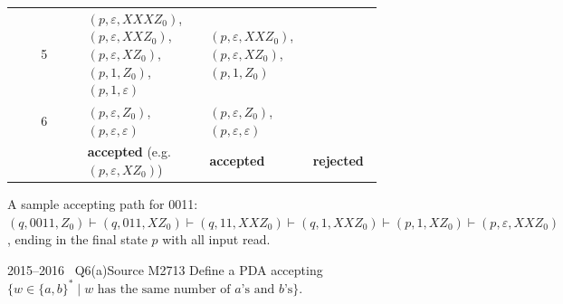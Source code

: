 \documentclass[11pt,a4paper]{article}
\newcommand{\eps}{\varepsilon}
\begin{document}
\begin{solution}
\begin{center}
\begin{tabular}{c >{\raggedright\arraybackslash}p{0.33\linewidth} >{\raggedright\arraybackslash}p{0.29\linewidth} >{\raggedright\arraybackslash}p{0.19\linewidth}}
5 & $(p,\eps,XXXZ_0)$,\ $(p,\eps,XXZ_0)$,\ $(p,\eps,XZ_0)$,\ $(p,1,Z_0)$,\ $(p,1,\eps)$ & $(p,\eps,XXZ_0)$,\ $(p,\eps,XZ_0)$,\ $(p,1,Z_0)$ & \\
6 & $(p,\eps,Z_0)$,\ $(p,\eps,\eps)$ & $(p,\eps,Z_0)$,\ $(p,\eps,\eps)$ & \\\midrule
 & \textbf{accepted} (e.g.\ $(p,\eps,XZ_0)$) & \textbf{accepted} & \textbf{rejected}\\\bottomrule
\end{tabular}\end{center}
A sample accepting path for 0011: $(q,0011,Z_0)\vdash(q,011,XZ_0)\vdash(q,11,XXZ_0)\vdash(q,1,XXZ_0)\vdash(p,1,XZ_0)\vdash(p,\eps,XXZ_0)$, ending in the final state $p$ with all input read.
\end{solution}

\begin{question}{2015--2016 \textbullet\ Q6(a)}{Source M27}{13}
Define a PDA accepting $\{w\in\{a,b\}^*\mid w \text{ has the same number of } a\text{'s and } b\text{'s}\}$.
\end{question}
\end{document}

